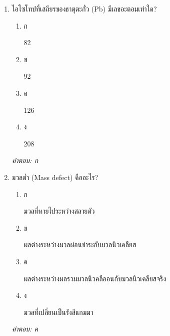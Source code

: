 \documentclass[12pt]{article}
\begin{document}
\begin{enumerate}[label=\arabic*., itemsep=0.5\baselineskip, topsep=0.5\baselineskip, leftmargin=*]
\item ไอโซโทปที่เสถียรของธาตุตะกั่ว (Pb) มีเลขอะตอมเท่าใด?
\begin{enumerate}[label=\alph*)., itemsep=0.3\baselineskip, topsep=0.3\baselineskip]
\item ก\ 
\begin{minipage}[t]{0.9\linewidth}
\raggedright 82
\end{minipage}
\item ข\ 
\begin{minipage}[t]{0.9\linewidth}
\raggedright 92
\end{minipage}
\item ค\ 
\begin{minipage}[t]{0.9\linewidth}
\raggedright 126
\end{minipage}
\item ง\ 
\begin{minipage}[t]{0.9\linewidth}
\raggedright 208
\end{minipage}
\end{enumerate}
\vspace{-0.3\baselineskip}
\begin{small}
\textit{คำตอบ: ก}
\end{small}

\item มวลต่ำ (Mass defect) คืออะไร?
\begin{enumerate}[label=\alph*)., itemsep=0.3\baselineskip, topsep=0.3\baselineskip]
\item ก\ 
\begin{minipage}[t]{0.9\linewidth}
\raggedright มวลที่หายไประหว่างสลายตัว
\end{minipage}
\item ข\ 
\begin{minipage}[t]{0.9\linewidth}
\raggedright ผลต่างระหว่างมวลผ่อนชำระกับมวลนิวเคลียส
\end{minipage}
\item ค\ 
\begin{minipage}[t]{0.9\linewidth}
\raggedright ผลต่างระหว่างผลรวมมวลนิวคลีออนกับมวลนิวเคลียสจริง
\end{minipage}
\item ง\ 
\begin{minipage}[t]{0.9\linewidth}
\raggedright มวลที่เปลี่ยนเป็นรังสีแกมมา
\end{minipage}
\end{enumerate}
\vspace{-0.3\baselineskip}
\begin{small}
\textit{คำตอบ: ค}
\end{small}


\end{enumerate}
\end{document}
